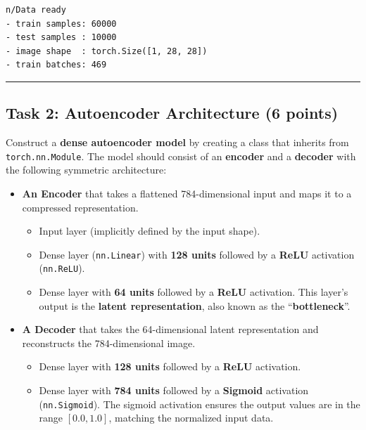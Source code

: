 \documentclass[
  letterpaper,
  DIV=11,
  numbers=noendperiod]{scrartcl}
\providecommand{\tightlist}{%
  \setlength{\itemsep}{0pt}\setlength{\parskip}{0pt}}\usepackage{longtable,booktabs,array}
\begin{document}
\label{task1}
\begin{verbatim}
n/Data ready
- train samples: 60000
- test samples : 10000
- image shape  : torch.Size([1, 28, 28])
- train batches: 469
\end{verbatim}

\begin{center}\rule{0.5\linewidth}{0.5pt}\end{center}

\subsection{Task 2: Autoencoder Architecture (6
points)}\label{task-2-autoencoder-architecture-6-points}

Construct a \textbf{dense autoencoder model} by creating a class that
inherits from \texttt{torch.nn.Module}. The model should consist of an
\textbf{encoder} and a \textbf{decoder} with the following symmetric
architecture:

\begin{itemize}
\item
  \textbf{An Encoder} that takes a flattened 784-dimensional input and
  maps it to a compressed representation.

  \begin{itemize}
  \tightlist
  \item
    Input layer (implicitly defined by the input shape).
  \item
    Dense layer (\texttt{nn.Linear}) with \textbf{128 units} followed by
    a \textbf{ReLU} activation (\texttt{nn.ReLU}).
  \item
    Dense layer with \textbf{64 units} followed by a \textbf{ReLU}
    activation. This layer's output is the \textbf{latent
    representation}, also known as the ``\textbf{bottleneck}''.
  \end{itemize}
\item
  \textbf{A Decoder} that takes the 64-dimensional latent representation
  and reconstructs the 784-dimensional image.

  \begin{itemize}
  \tightlist
  \item
    Dense layer with \textbf{128 units} followed by a \textbf{ReLU}
    activation.
  \item
    Dense layer with \textbf{784 units} followed by a \textbf{Sigmoid}
    activation (\texttt{nn.Sigmoid}). The sigmoid activation ensures the
    output values are in the range \([0.0, 1.0]\), matching the
    normalized input data.
  \end{itemize}
\end{itemize}
\end{document}
